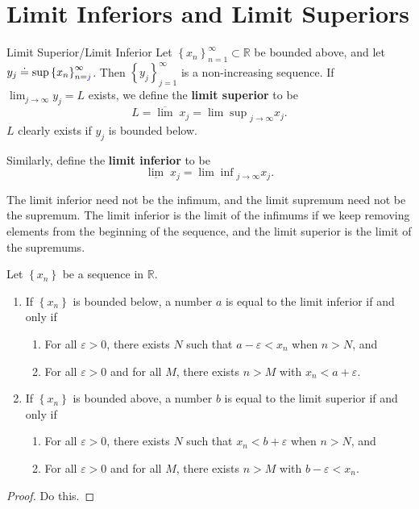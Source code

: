 \documentclass[10pt]{report}
\begin{document}
\section{Limit Inferiors and Limit Superiors}
\begin{defn}{Limit Superior/Limit Inferior}{}
Let $\left\{ x_n \right\}_{n=1}^\infty \subset \mathbb{R}$ be bounded above, and let $y_j \doteq \sup\left\{ x_n \right\}_{n={\color{blue}j}}^{\infty}$. Then $\left\{ y_j \right\}_{j=1}^\infty$ is a non-increasing sequence. If $\lim_{j \to \infty} y_j=L$ exists, we define the \textbf{limit superior} to be
\[
	L = \overline{\lim} \;x_j = {\lim\sup}_{j\to\infty}x_j.
\] 
$L$ clearly exists if $y_j$ is bounded below.

Similarly, define the \textbf{limit inferior} to be
\[
	\underline{\lim} \;x_j = {\lim\inf}_{j\to\infty} x_j.
\] 
\end{defn}

The limit inferior need not be the infimum, and the limit supremum need not be the supremum. The limit inferior is the limit of the infimums if we keep removing elements from the beginning of the sequence, and the limit superior is the limit of the supremums.

\begin{prop}
	Let $\left\{ x_n \right\}$ be a sequence in $\mathbb{R}$.
	\begin{enumerate}
		\item If $\left\{ x_n \right\}$ is bounded below, a number $a$ is equal to the limit inferior if and only if
			\begin{enumerate}
				\item For all $\varepsilon>0$, there exists $N$ such that $a-\varepsilon<x_n$ when $n>N$, and
				\item For all $\varepsilon>0$ and for all $M$, there exists $n > M$ with $x_n < a + \varepsilon$.
			\end{enumerate}

		\item If $\left\{ x_n \right\}$ is bounded above, a number $b$ is equal to the limit superior if and only if
			\begin{enumerate}
				\item For all $\varepsilon>0$, there exists $N$ such that $x_n < b + \varepsilon$ when $n >N$, and
				\item For all $\varepsilon>0$ and for all $M$, there exists $n > M$ with $b-\varepsilon< x_n$.
			\end{enumerate}
	\end{enumerate}
\end{prop}
\begin{proof}
	{\color{red}Do this.}
\end{proof}
\end{document}
